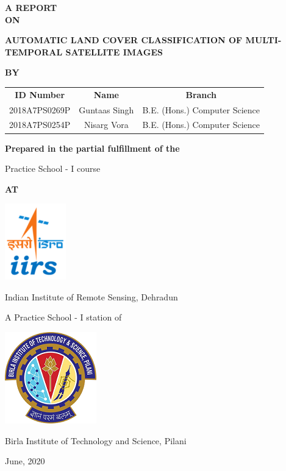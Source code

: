 \documentclass[12pt, a4paper]{report}
\begin{document}
\begin{titlepage}
\vspace*{0.3cm}
\begin{center} \textbf{A REPORT\\ON} \end{center}
\begin{center} \textbf{{\Large AUTOMATIC LAND COVER CLASSIFICATION OF MULTI-TEMPORAL SATELLITE IMAGES}} \end{center}
\begin{center} \textbf{BY} \end{center}
\begin{center}
	\begin{tabular}{c c c}
		\textbf{ID Number} & \textbf{Name} & \textbf{Branch} \\
		2018A7PS0269P & Guntaas Singh & B.E. (Hons.) Computer Science \\
		2018A7PS0254P & Nisarg Vora  & B.E. (Hons.) Computer Science \\
	\end{tabular} 
\end{center}
\begin{onehalfspace}
\begin{center} \textbf{Prepared in the partial fulfillment of the} \end{center}
\begin{center} Practice School - I course \end{center}
\begin{center} \textbf{AT} \end{center}
\begin{center} \includegraphics{iirs.png} \end{center}
\begin{center} {\Large Indian Institute of Remote Sensing, Dehradun} \end{center}
\begin{center} A Practice School - I station of \end{center}
\begin{center} {\includegraphics{bits.png}} \end{center}
\begin{center} {\Large Birla Institute of Technology and Science, Pilani} \end{center}
\begin{center} June, 2020 \end{center}
\end{onehalfspace}
\end{titlepage}
\end{document}
